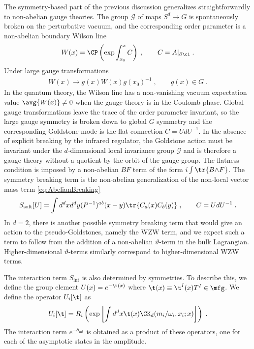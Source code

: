 \documentclass[11pt]{article}
\def\o{{\omega}}
\def\p{{\partial}}
\def\w{{\wedge}}
\begin{document}
The symmetry-based part of the previous discussion generalizes straightforwardly to non-abelian gauge theories. The group $\mathcal{G}$ of maps $S^d\to G$ is spontaneously broken on the perturbative vacuum, and the corresponding order parameter is a non-abelian boundary Wilson line
\begin{equation}
\begin{split}
W(x) = \CP \left( \exp \int_{x_0}^{x} C \right) \; , \qquad C = A |_{\p \ci} \;  . 
\end{split}
\end{equation}
Under large gauge transformations
\begin{equation}
\begin{split}
W(x) \to g(x) W(x) g(x_0)^{-1} \; , \qquad g(x) \in G \; . 
\end{split}
\end{equation}
In the quantum theory, the Wilson line has a non-vanishing vacuum expectation value $\avg{ W(x) } \neq 0$ when the gauge theory is in the Coulomb phase. Global gauge transformations leave the trace of the order parameter invariant, so the large gauge symmetry is broken down to global $G$ symmetry and the corresponding Goldstone mode is the flat connection $C=U d U^{-1}$. In the absence of explicit breaking by the infrared regulator, the Goldstone action must be invariant under the $d$-dimensional local invariance group $\mathcal{G}$ and is therefore a gauge theory without a quotient by the orbit of the gauge group. The flatness condition is imposed by a non-abelian $BF$ term of the form $i \int \tr{ B \w F }$. The symmetry breaking term is the non-abelian generalization of the non-local vector mass term \eqref{eq:AbelianBreaking}
\begin{equation}
\begin{split}\label{ymaction}
S_{\text{soft}}[U] = \int d^d x d^d y (P^{-1})^{ab}(x-y) \tr{ C_a(x) C_b(y) } \; , \qquad C = U d U^{-1} \; .
\end{split}
\end{equation}
In $d=2$, there is another possible symmetry breaking term that would give an action to the pseudo-Goldstones, namely the WZW term, and we expect such a term to follow from the addition of a non-abelian $\vartheta$-term in the bulk Lagrangian. Higher-dimensional $\vartheta$-terms similarly correspond to higher-dimensional WZW terms.

The interaction term $S_{\text{int}}$ is also determined by symmetries. To describe this, we define the group element $U(x) = e^{ - \t(x) } $ where $\t(x)\equiv \t^I(x) T^I  \in \mfg$. We define the operator $U_i[\t]$ as
\begin{equation}\label{eq:nonAbelianOp}
\begin{split}
U_i[\t] = R_i \left( \exp \left[  \int d^d x \t(x) \CK_d ( m_i / \o_i , x_i ; x )\right] \right) \; .
\end{split}
\end{equation}
The interaction term $e^{-S_{\text{int}}}$ is obtained as a product of these operators, one for each of the asymptotic states in the amplitude. 
\end{document}
